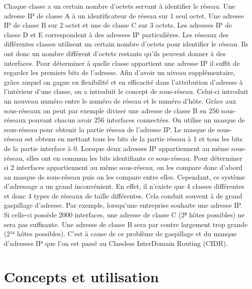 \documentclass[twoside,openright,a4paper,11pt,french]{article}
\begin{document}
Chaque classe a un certain nombre d'octets servant à identifier le réseau. Une adresse IP de classe A à un identificateur de réseau sur 1 seul octet. Une adresse IP de classe B sur 2 octet et une de classe C sur 3 octets. Les adresses IP de classe D et E correspondent à des adresses IP particulières.
Les réseaux des différentes classes utilisent un certain nombre d'octets pour identifier le réseau. Ils ont donc un nombre différent d'octets restants qu'ils peuvent donner à des interfaces. 
Pour déterminer à quelle classe appartient une adresse IP il suffit de regarder les premiers bits de l'adresse.
Afin d'avoir un niveau supplémentaire, grâce auquel on gagne en flexibilité et en efficacité dans l'attribution d'adresse à l'intérieur d'une classe, on a introduit le concept de sous-réseau. Celui-ci introduit un nouveau numéro entre le numéro de réseau et le numéro d'hôte. Grâce aux sous-réseaux on peut par exemple diviser une adresse de classe B en 256 sous-réseaux pouvant chacun avoir 256 interfaces connectées.
On utilise un masque de sous-réseau pour obtenir la partie réseau de l'adresse IP. Le masque de sous-réseau est obtenu en mettant tous les bits de la partie réseau à 1 et tous les bits de la partie interface à 0. Lorsque deux adresses IP appartiennent au même sous-réseau, elles ont en commun les bits identifiants ce sous-réseau. Pour déterminer si 2 interfaces appartiennent au même sous-réseau, on les compare donc d'abord au masque de sous-réseau puis on les compare entre elles.
Cependant, ce système d'adressage a un grand inconvénient. En effet, il n'existe que 4 classes différentes et donc 4 types de réseaux de taille différentes. Cela conduit souvent à de grand gaspillage d'adresse. Par exemple, lorsqu'une entreprise souhaite une adresse IP. Si celle-ci possède 2000 interfaces, une adresse de classe C (2⁸ hôtes possibles) ne sera pas suffisante. Une adresse de classe B sera par contre largement trop grande (2¹⁶ hôtes possibles). C'est à cause de ce problème de gaspillage et du manque d'adresses IP que l'on est passé au   Classless InterDomain Routing (CIDR).



\section{Concepts et utilisation}



\end{document}
